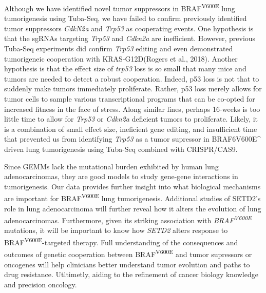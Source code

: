 Although we have identified novel tumor suppressors in BRAF\textsuperscript{V600E} lung tumorigenesis using Tuba-Seq, we have failed to confirm previously identified tumor suppressors \emph{CdkN2a} and \emph{Trp53} as cooperating events.
One hypothesis is that the sgRNAs targeting \emph{Trp53} and \emph{Cdkn2a} are inefficient. However, previous Tuba-Seq experiments did confirm \emph{Trp53} editing and even demonstrated tumorigeneic cooperation with KRAS-G12D(Rogers et al., 2018).
Another hypothesis is that the effect size of \emph{trp53} loss is so small that many mice and tumors are needed to detect a robust cooperation.
Indeed, p53 loss is not that to suddenly make tumors immediately proliferate.
Rather, p53 loss merely allows for tumor cells to sample various transcriptional programs that can be co-opted for increased fitness in the face of stress.
Along similar lines, perhaps 16-weeks is too little time to allow for \emph{Trp53} or \emph{Cdkn2a} deficient tumors to proliferate.
Likely, it is a combination of small effect size, ineficient gene editing, and insufficient time that prevented us from identifying \emph{Trp53} as a tumor supressor in BRAF6V600E\^{} driven lung tumorigenesis using Tuba-Seq combined with CRISPR/CAS9.

Since GEMMs lack the mutational burden exhibited by human lung adenocarcinomas, they are good models to study gene-gene interactions in tumorigenesis.
Our data provides further insight into what biological mechanisms are important for BRAF\textsuperscript{V600E} lung tumorigenesis.
Additional studies of SETD2's role in lung adenocarcinoma will further reveal how it alters the evolution of lung adenocarcinomas.
Furthermore, given its striking association with \emph{BRAF\textsuperscript{V600E}} mutations, it will be important to know how \emph{SETD2} alters response to BRAF\textsuperscript{V600E}-targeted therapy.
Full understanding of the consequences and outcomes of genetic cooperation between BRAF\textsuperscript{V600E} and tumor supressors or oncogenes will help clinicians better understand tumor evolution and paths to drug resistance.
Utltimetly, aiding to the refinement of cancer biology knowledge and precision oncology.

